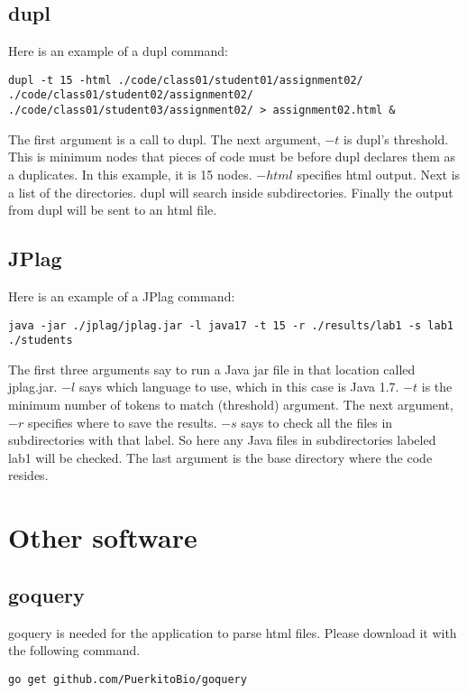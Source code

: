 \documentclass[12pt]{article}
\begin{document}
		\subsection{dupl}
			Here is an example of a dupl command:
			\begin{lstlisting}[breaklines=true]
dupl -t 15 -html ./code/class01/student01/assignment02/ ./code/class01/student02/assignment02/ ./code/class01/student03/assignment02/ > assignment02.html &
			\end{lstlisting}
			\noindent The first argument is a call to dupl. The next argument, $-t$ is dupl's threshold. This is minimum nodes that pieces of code must be before dupl declares them as a duplicates. In this example, it is 15 nodes. $-html$ specifies html output. Next is a list of the directories. dupl will search inside subdirectories. Finally the output from dupl will be sent to an html file.
			
		\subsection{JPlag}
			Here is an example of a JPlag command:
			\begin{lstlisting}[breaklines=true]		
java -jar ./jplag/jplag.jar -l java17 -t 15 -r ./results/lab1 -s lab1 ./students
			\end{lstlisting}
			\noindent The first three arguments say to run a Java jar file in that location called jplag.jar. $-l$ says which language to use, which in this case is Java 1.7. $-t$ is the minimum number of tokens to match (threshold) argument. The next argument, $-r$ specifies where to save the results. $-s$ says to check all the files in subdirectories with that label. So here any Java files in subdirectories labeled lab1 will be checked. The last argument is the base directory where the code resides.
			
	\section{Other software}
		\subsection{goquery}
			goquery is needed for the application to parse html files. Please download it with the following command.
			\begin{lstlisting}[breaklines=true]	
go get github.com/PuerkitoBio/goquery
			\end{lstlisting}
			
\end{document}
